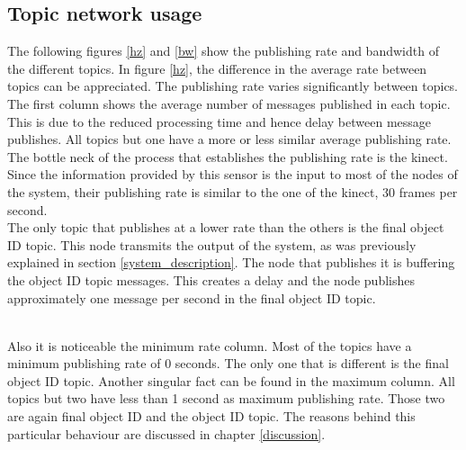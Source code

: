 		\subsection{Topic network usage}
		\label{results_topics}

			The following figures \ref{hz} and \ref{bw} show the publishing rate and bandwidth of the different topics. 
			In figure \ref{hz}, the difference in the average rate between topics can be appreciated. 
			The publishing rate varies significantly between topics. 
			The first column shows the average number of messages published in each topic. 
			This is due to the reduced processing time and hence delay between message publishes. 
			All topics but one have a more or less similar average publishing rate.
			The bottle neck of the process that establishes the publishing rate is the kinect. 
			Since the information provided by this sensor is the input to most of the nodes of the system, their publishing rate is similar to the one of the kinect, 30 frames per second.  
			\\

			The only topic that publishes at a lower rate than the others is the final object ID topic. 
			This node transmits the output of the system, as was previously explained in section \ref{system_description}.
			The node that publishes it is buffering the object ID topic messages. 
			This creates a delay and the node publishes approximately one message per second in the final object ID topic. 

			\\


			Also it is noticeable the minimum rate column. 
			Most of the topics have a minimum publishing rate of 0 seconds.
			The only one that is different is the final object ID topic. 
			Another singular fact can be found in the maximum column. 
			All topics but two have less than 1 second as maximum publishing rate. 
			Those two are again final object ID and the object ID topic. 
			The reasons behind this particular behaviour are discussed in chapter \ref{discussion}. 
			\\

